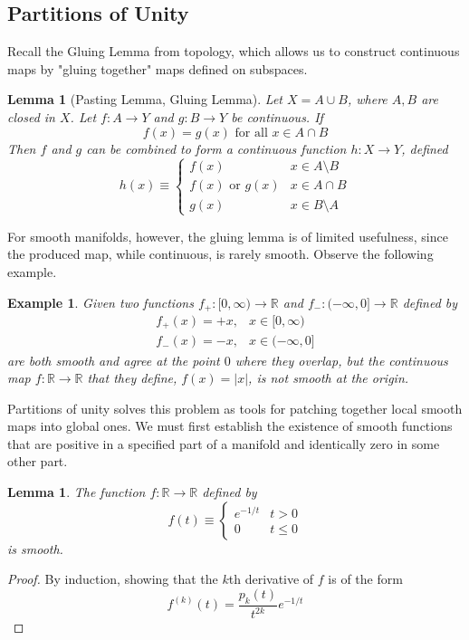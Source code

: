 \documentclass{article}
\newtheorem{lemma}[theorem]{Lemma}
\newtheorem{example}{Example}[section]
\theoremstyle{remark}
\theoremstyle{definition}
\begin{document}
\subsection{Partitions of Unity}
Recall the Gluing Lemma from topology, which allows us to construct continuous maps by "gluing together" maps defined on subspaces. 

\begin{lemma}[Pasting Lemma, Gluing Lemma]
Let $X = A \cup B$, where $A, B$ are closed in $X$. Let $f: A \longrightarrow Y$ and $g: B \longrightarrow Y$ be continuous. If 
\[f(x) = g(x) \text{ for all } x \in A \cap B\]
Then $f$ and $g$ can be combined to form a continuous function $h: X \longrightarrow Y$, defined
\[h(x) \equiv \begin{cases}
      f(x) & x \in A \setminus B \\
      f(x) \text{ or } g(x) & x \in A \cap B \\
      g(x) & x \in B \setminus A
\end{cases}\]
\end{lemma}

For smooth manifolds, however, the gluing lemma is of limited usefulness, since the produced map, while continuous, is rarely smooth. Observe the following example. 

\begin{example}
Given two functions $f_+: [0, \infty) \longrightarrow \mathbb{R}$ and $f_-: (-\infty, 0] \longrightarrow \mathbb{R}$ defined by 
\begin{align*}
    f_+(x) = + x, & x \in [0, \infty) \\
    f_-(x) = - x, & x \in (-\infty, 0]
\end{align*}
are both smooth and agree at the point $0$ where they overlap, but the continuous map $f: \mathbb{R} \longrightarrow \mathbb{R}$ that they define, $f(x) = |x|$, is not smooth at the origin. 
\end{example}

Partitions of unity solves this problem as tools for patching together local smooth maps into global ones. We must first establish the existence of smooth functions that are positive in a specified part of a manifold and identically zero in some other part. 

\begin{lemma}
The function $f: \mathbb{R} \longrightarrow \mathbb{R}$ defined by 
\[f(t) \equiv \begin{cases}
      e^{-1/t} & t > 0 \\
      0 & t \leq 0
\end{cases}\]
is smooth. 
\end{lemma}
\begin{proof}
By induction, showing that the $k$th derivative of $f$ is of the form
\[f^{(k)} (t) = \frac{p_k (t)}{t^{2k}} e^{-1/t}\]
\end{proof}
\end{document}
